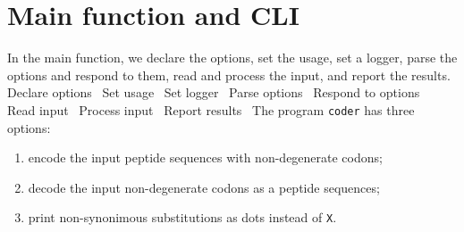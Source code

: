 \section{Main function and CLI}
In the main function, we declare the options, set the usage, set a
logger, parse the options and respond to them, read and process the
input, and report the results.
\nwenddocs{}\endmoddef\nwstartdeflinemarkup{}\nwenddeflinemarkup
\LA{}Declare options~{\nwtagstyle{}}\RA{}
\LA{}Set usage~{\nwtagstyle{}}\RA{}
\LA{}Set logger~{\nwtagstyle{}}\RA{}
\LA{}Parse options~{\nwtagstyle{}}\RA{}
\LA{}Respond to options~{\nwtagstyle{}}\RA{}
\LA{}Read input~{\nwtagstyle{}}\RA{}
\LA{}Process input~{\nwtagstyle{}}\RA{}
\LA{}Report results~{\nwtagstyle{}}\RA{}
\nwendcode{}\nwdocspar
The program \texttt{coder} has three options:

\begin{enumerate}
\itemsep0em
\item encode the input peptide sequences with non-degenerate codons;
\item decode the input non-degenerate codons as a peptide sequences;
\item print non-synonimous substitutions as dots instead of \texttt{X}.
\end{enumerate}

